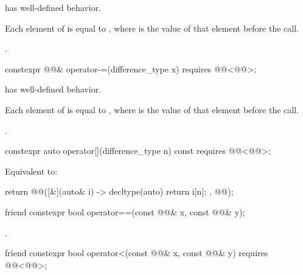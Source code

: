 \begin{itemdescr}
\pnum
\expects
{} has well-defined behavior.

\pnum
\ensures
Each element of  is equal to ,
where  is the value of that element before the call.

\pnum
\returns
{}.
\end{itemdescr}

\begin{itemdecl}
constexpr @@& operator-=(difference_type x)
  requires @@<@@>;
\end{itemdecl}

\begin{itemdescr}
\pnum
\expects
{} has well-defined behavior.

\pnum
\ensures
Each element of  is equal to ,
where  is the value of that element before the call.

\pnum
\returns
{}.
\end{itemdescr}

\begin{itemdecl}
constexpr auto operator[](difference_type n) const
  requires @@<@@>;
\end{itemdecl}

\begin{itemdescr}
\pnum
\effects
Equivalent to:
\begin{codeblock}
return @@([&](auto& i) -> decltype(auto) { return i[n]; }, @@);
\end{codeblock}
\end{itemdescr}

\begin{itemdecl}
friend constexpr bool operator==(const @@& x, const @@& y);
\end{itemdecl}

\begin{itemdescr}
\pnum
\returns
{}.
\end{itemdescr}

\begin{itemdecl}
friend constexpr bool operator<(const @@& x, const @@& y)
  requires @@<@@>;
\end{itemdecl}


